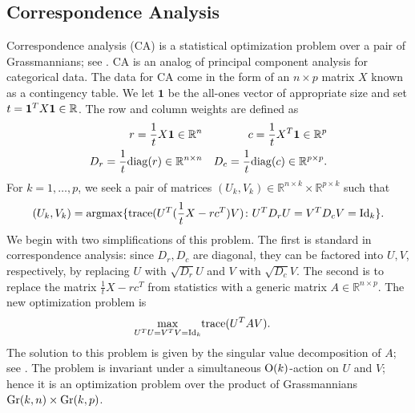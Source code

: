 \documentclass[12pt]{extarticle}
\theoremstyle{definition}
\numberwithin{theorem}{section}
\newcommand{\RR}{\mathbb{R}}
\begin{document}
\subsection{Correspondence Analysis} 
Correspondence analysis (CA) is a statistical optimization problem over a pair of Grassmannians; see \cite{CG22, YWL}. 
CA is an analog of principal component analysis for categorical data. 
The data for CA come in the form of an $n \times p$ matrix $X$ known as a contingency table. 
We let $\mathbf{1}$ be the all-ones vector of appropriate size and set $t = \mathbf{1}^T X{\bf 1} \in \RR$. 
The row and column weights are defined as 
\begin{align*}
    r = \frac 1 t X {\bf 1} \in \RR_{}^n &&
    c = \frac 1 t X^T {\bf 1} \in \RR_{}^p\\
     D_r = \frac 1 t {\rm diag}(r) \in \RR_{}^{n \times n} &&
    D_c = \frac 1 t {\rm diag}(c) \in \RR_{}^{p \times p}.
\end{align*}
For $k = 1, \ldots, p$, we seek a pair of matrices $(U_k, V_k) \in \RR^{n \times k} \times \RR^{p \times k}$ such that 
\begin{align*}
    (U_k, V_k) = {\rm argmax}\{{\rm trace}(U^T(\frac 1 t X - rc^T)V) \colon U^TD_rU = V^TD_cV = {\rm Id}_k\}.
\end{align*}
We begin with two simplifications of this problem. 
The first is standard in correspondence analysis: since $D_r, D_c$ are diagonal, they can be factored into $U, V$, respectively, by replacing $U$ with $\sqrt{D_r}U$ and $V$ with $\sqrt{D_c}V$. 
The second is to replace the matrix $\frac 1 t X - rc^T$ from statistics with a generic matrix $A \in \RR^{n \times p}$.
The new optimization problem is
\begin{align}\label{eq:CA}
    \max_{U^TU = V^TV = {\rm Id}_k} &{\rm trace}(U^TAV).
\end{align}
The solution to this problem is given by the singular value decomposition of $A$; see \cite{CG22}. 
The problem is invariant under a simultaneous ${\rm O}(k)$-action on $U$ and $V$; hence it is an optimization problem over the product of Grassmannians ${\rm Gr}(k, n) \times {\rm Gr}(k, p)$.
\end{document}
